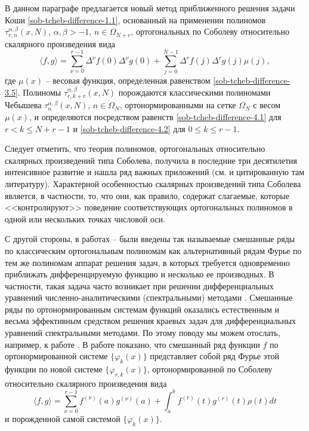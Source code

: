 В данном параграфе предлагается новый метод приближенного решения задачи Коши \eqref{sob-tcheb-difference-1.1}, основанный на применении полиномов $\tau _{r,n}^{\alpha,\beta}(x,N)$, $\alpha,\beta>-1$, $n\in\Omega_{N+r}$, ортогональных по Соболеву относительно скалярного произведения вида
\begin{equation}\label{sob-tcheb-difference-1.4}
\langle f,g \rangle =
\sum_{\nu=0}^{r-1}\Delta^\nu f(0)\Delta^\nu g(0)+
\sum_{j=0}^{N-1}\Delta^rf(j)\Delta^rg(j)\mu(j),
\end{equation}
где $\mu(x)$ -- весовая функция, определенная равенством \eqref{sob-tcheb-difference-3.5}.
Полиномы $\tau _{r,k+r}^{\alpha,\beta}(x,N)$ порождаются классическими полиномами Чебышева $\tau_n^{\alpha,\beta}(x,N)$, $n\in\Omega_N$, ортонормированными на сетке $\Omega_N$  с весом $\mu(x)$, и определяются посредством равенств \eqref{sob-tcheb-difference-4.1} для $r<k \le N+r-1$ и \eqref{sob-tcheb-difference-4.2} для $0 \le k \le r-1$.

Следует отметить, что теория   полиномов, ортогональных относительно скалярных произведений типа Соболева, получила  в последние три десятилетия интенсивное развитие  и нашла ряд важных приложений (см. \cite{Haar-Tcheb-IserKoch,Haar-Tcheb-MarcelAlfaroRezola,Haar-Tcheb-Meijer,Haar-Tcheb-KwonLittl1,Haar-Tcheb-KwonLittl2,Haar-Tcheb-MarcelXu} 
и цитированную там литературу). Характерной особенностью скалярных  произведений типа Соболева является, в частности, то, что они, как правило,  содержат слагаемые, которые <<контролируют>> поведение соответствующих ортогональных полиномов в одной или нескольких точках числовой оси.

С другой стороны, в работах \cite{meixner-18} -- \cite{sob-tcheb-difference-Shar9} были введены так называемые смешанные ряды по классическим ортогональным полиномам   как альтернативный рядам Фурье по тем же полиномам аппарат решения задач, в которых требуется одновременно приближать дифференцируемую функцию и несколько ее производных.
В частности, такая задача часто возникает при решении  дифференциальных уравнений численно-аналитическими (спектральными) методами  \cite{Haar-Tcheb-SolDmEg,Haar-Tcheb-Tref1,Haar-Tcheb-Tref2}. Смешанные ряды по ортонормированным системам функций оказались естественным и весьма эффективным средством   решения краевых задач для дифференциальных уравнений спектральными методами. По этому поводу мы можем отослать, например, к работе \cite{Haar-Tcheb-MMG2016}. В работе \cite{meixner-18} показано, что смешанный ряд функции $f$ по ортонормированной системе $\{\varphi_k(x)\}$ представляет собой  ряд Фурье этой функции по новой системе $\{\varphi_{r,k}(x)\}$, ортонормированной по Соболеву относительно скалярного произведения вида
\begin{equation}\label{sob-tcheb-difference-1.5}
\langle f,g \rangle=
\sum_{\nu=0}^{r-1}f^{(\nu)}(a)g^{(\nu)}(a)+\int_{a}^{b} f^{(r)}(t)g^{(r)}(t)\rho(t) dt
\end{equation}
и порожденной самой системой $\{\varphi_k(x)\}$.

